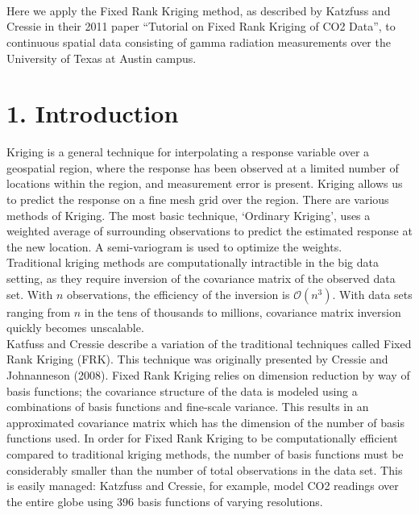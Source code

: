 \documentclass[11pt]{article}
\title{
\vspace{2in}
\textmd{\textbf{\hmwkTitle}}\\
\normalsize\vspace{0.1in}\small{\hmwkDueDate}\\
\vspace{0.1in}\large{\textit{\hmwkClassInstructor\ }}
\vspace{3in}
}
\author{\textbf{\hmwkAuthorName}}
\date{} %
\begin{document}
\maketitle



\newpage

Here we apply the Fixed Rank Kriging method, as described by Katzfuss and Cressie in their 2011 paper ``Tutorial on Fixed Rank Kriging of CO2 Data'', to continuous spatial data consisting of gamma radiation measurements over the University of Texas at Austin campus.  

\section{1. Introduction}

Kriging is a general technique for interpolating a response variable over a geospatial region, where the response has been observed at a limited number of locations within the region, and measurement error is present.  Kriging allows us to predict the response on a fine mesh grid over the region. There are various methods of Kriging.  The most basic technique, `Ordinary Kriging', uses a weighted average of surrounding observations to predict the estimated response at the new location.  A semi-variogram is used to optimize the weights.  \\

Traditional kriging methods are computationally intractible in the big data setting, as they  require inversion of the covariance matrix of the observed data set.  With $n$ observations, the efficiency of the inversion is $\mathcal{O}(n^3)$. With data sets ranging from $n$ in the tens of thousands to millions, covariance matrix inversion quickly becomes unscalable. \\

Katfuss and Cressie describe a variation of the traditional techniques called Fixed Rank Kriging (FRK). This technique was originally presented by Cressie and Johnanneson (2008).  Fixed Rank Kriging relies on dimension reduction by way of basis functions; the covariance structure of the data is modeled using a combinations of basis functions and fine-scale variance.  This results in an approximated covariance matrix which has the dimension of the number of basis functions used.  In order for Fixed Rank Kriging to be computationally efficient compared to traditional kriging methods, the number of basis functions must be considerably smaller than the number of total observations in the data set.  This is easily managed: Katzfuss and Cressie, for example, model CO2 readings over the entire globe using $396$ basis functions of varying resolutions.  \\
\end{document}
